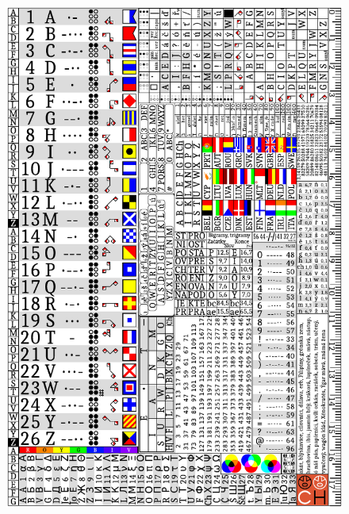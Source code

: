\documentclass[a5paper,10pt,twoside,twocolumn]{memoir}
\begin{document}
\begin{figure}[p]
\centering
\includegraphics{pomucky/p2.pdf}
\end{figure}
















\end{document}
